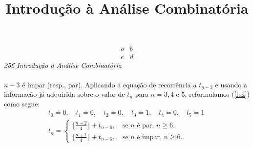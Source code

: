 \documentclass[a4paper,12pt]{book}
\title{Introdução à Análise Combinatória}
\begin{document}
\maketitle
\setlength{\voffset}{-0.75in}

\chapter{}
\chapter{}
\chapter{}
\chapter{}
\chapter{}
\chapter{}
\begin{align}
a&b\\
c&d \label{luz}
\end{align}
\newpage
\thispagestyle{empty}
\hspace{-0.6cm}\textit{256}
\hfill
\textit{Introdução à Análise Combinatória}
\\\\
$n-3$ é ímpar (resp., par). Aplicando a equação de recorrência a $t_{n-3}$ e usando a informação já adquirida sobre o valor de $t_n$ para $n=3,4 \mbox{ e }5$, reformulamos (\ref{luz}) como segue:
\begin{align}
&t_0=0,\quad t_1=0,\quad t_2=0,\quad t_3=1,\quad t_4=0,\quad t_5=1\quad \nonumber \\
&t_n=\left\{
\begin{array}{ll}
\lfloor \frac{n-2}{4} \rfloor+t_{n-6}, \quad \mbox{se } n  \mbox{ é par, }n \geq 6.\\
\lfloor \frac{n+1}{4} \rfloor+t_{n-6}, \quad \mbox{se } n  \mbox{ é ímpar, }n \geq 6. 
\end{array} \label{trevas}
\right.
\end{align}
\end{document}
